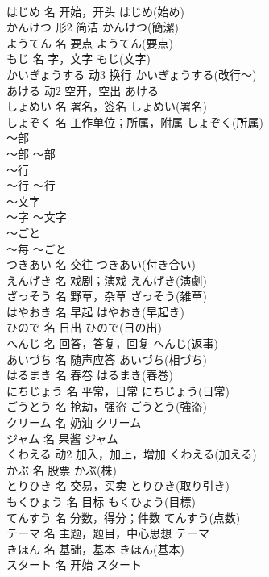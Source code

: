 \documentclass[8pt]{extreport}
\begin{document}
\begin{CJK}{UTF8}{min}
\\	はじめ	名	开始，开头	はじめ(始め)	
\\	かんけつ	形2	简洁	かんけつ(簡潔)	
\\	ようてん	名	要点	ようてん(要点)	
\\	もじ	名	字，文字	もじ(文字)	
\\	かいぎょうする	动3	换行	かいぎょうする(改行～)	
\\	あける	动2	空开，空出	あける	
\\	しょめい	名	署名，签名	しょめい(署名)	
\\	しょぞく	名	工作单位；所属，附属	しょぞく(所属)	
\\	～部	
\\	～部	～部	
\\	～行	
\\	～行	～行	
\\	～文字	
\\	～字	～文字	
\\	～ごと	
\\	～每	～ごと	
\\	つきあい	名	交往	つきあい(付き合い)	
\\	えんげき	名	戏剧；演戏	えんげき(演劇)	
\\	ざっそう	名	野草，杂草	ざっそう(雑草)	
\\	はやおき	名	早起	はやおき(早起き)	
\\	ひので	名	日出	ひので(日の出)	
\\	へんじ	名	回答，答复，回复	へんじ(返事)	
\\	あいづち	名	随声应答	あいづち(相づち)	
\\	はるまき	名	春卷	はるまき(春巻)	
\\	にちじょう	名	平常，日常	にちじょう(日常)	
\\	ごうとう	名	抢劫，强盗	ごうとう(強盗)	
\\	クリーム	名	奶油	クリーム	
\\	ジャム	名	果酱	ジャム	
\\	くわえる	动2	加入，加上，增加	くわえる(加える)	
\\	かぶ	名	股票	かぶ(株)	
\\	とりひき	名	交易，买卖	とりひき(取り引き)	
\\	もくひょう	名	目标	もくひょう(目標)	
\\	てんすう	名	分数，得分；件数	てんすう(点数)	
\\	テーマ	名	主题，题目，中心思想	テーマ	
\\	きほん	名	基础，基本	きほん(基本)	
\\	スタート	名	开始	スタート	

\end{CJK}
\end{document}
